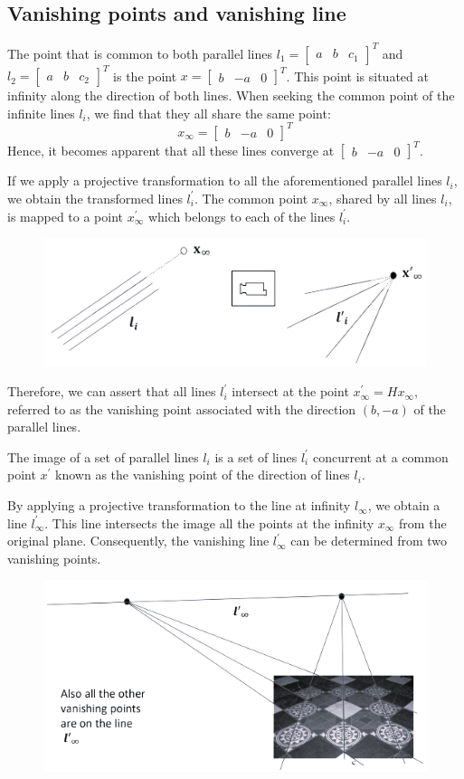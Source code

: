 \subsection*{Vanishing points and vanishing line}
The point that is common to both parallel lines $l_1={\begin{bmatrix} a & b & c_1 \end{bmatrix}}^{T}$ and $l_2={\begin{bmatrix} a & b & c_2 \end{bmatrix}}^{T}$ is the point $x={\begin{bmatrix} b & -a & 0 \end{bmatrix}}^{T}$. 
This point is situated at infinity along the direction of both lines.
When seeking the common point of the infinite lines $l_i$, we find that they all share the same point:
\[x_{\infty}={\begin{bmatrix} b & -a & 0 \end{bmatrix}}^{T}\]
Hence, it becomes apparent that all these lines converge at ${\begin{bmatrix} b & -a & 0 \end{bmatrix}}^{T}$. 

If we apply a projective transformation to all the aforementioned parallel lines $l_i$, we obtain the transformed lines $l_i^{'}$. 
The common point $x_{\infty}$, shared by all lines $l_i$, is mapped to a point $x_{\infty}^{'}$ which belongs to each of the lines $l_i^{'}$. 
\begin{figure}[H]
    \centering
    \includegraphics[width=0.5\linewidth]{images/vanishing.png}
\end{figure}
Therefore, we can assert that all lines $l_i^{'}$ intersect at the point $x_{\infty}^{'}=Hx_{\infty}$, referred to as the vanishing point associated with the direction $(b,-a)$ of the parallel lines. 
\begin{theorem}
    The image of a set of parallel lines $l_i$ is a set of lines $l_i^{'}$ concurrent at a common point $x^{'}$ known as the vanishing point of the direction of lines $l_i$. 
\end{theorem}

By applying a projective transformation to the line at infinity $l_{\infty}$, we obtain a line $l_{\infty}^{'}$. 
This line intersects the image all the points at the infinity $x_{\infty}$ from  the original plane. 
Consequently, the vanishing line $l_{\infty}^{'}$ can be determined from two vanishing points. 
\begin{figure}[H]
    \centering
    \includegraphics[width=0.5\linewidth]{images/vanishingline.png}
\end{figure}

